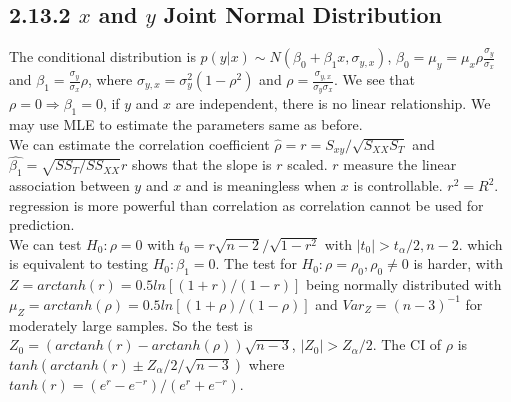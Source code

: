 \begin{multicols*}{3}
\subsection{2.13.2 $x$ and $y$ Joint Normal Distribution}
The conditional distribution is $p(y|x) \sim N(\beta_0 + \beta_1x, \sigma_{y,x})$, $\beta_0 = \mu_y = \mu_x\rho\frac{\sigma_y}{\sigma_x}$ and $\beta_1 = \frac{\sigma_y}{\sigma_x}\rho$, where $\sigma_{y,x} = \sigma_y^2(1 - \rho^2)$ and $\rho = \frac{\sigma_{y,x}}{\sigma_y\sigma_x}$. We see that $\rho = 0 \Rightarrow \beta_1 = 0$, if $y$ and $x$ are independent, there is no linear relationship. We may use MLE to estimate the parameters same as before. \\ 
We can estimate the correlation coefficient $\hat{\rho} = r = S_{xy}/\sqrt{S_{XX}S_T}$ and $\hat{\beta_1} = \sqrt{SS_T/SS_{XX}}r$ shows that the slope is $r$ scaled. $r$ measure the linear association between $y$ and $x$ and is meaningless when $x$ is controllable. $r^2 = R^2$. regression is more powerful than correlation as correlation cannot be used for prediction. \\
We can test $H_0: \rho = 0$ with $t_0 = r\sqrt{n-2}/\sqrt{1-r^2}$ with $|t_0| > t_\alpha/2,n-2$. which is equivalent to testing $H_0: \beta_1 = 0$. The test for $H_0: \rho = \rho_0, \rho_0 \ne 0$ is harder, with $Z = arctanh(r) = 0.5ln[(1+r)/(1-r)]$ being normally distributed with $\mu_Z = arctanh(\rho) = 0.5ln[(1+\rho)/(1-\rho)]$ and $Var_Z=(n-3)^{-1}$ for moderately large samples. So the test is $Z_0 = (arctanh(r)-arctanh(\rho))\sqrt{n-3}$, $|Z_0| > Z_\alpha/2$. The CI of $\rho$ is $tanh(arctanh(r) \pm  Z_\alpha/2/\sqrt{n-3})$ where $tanh(r) = (e^r-e^{-r})/(e^r+e^{-r})$.

\end{multicols*}